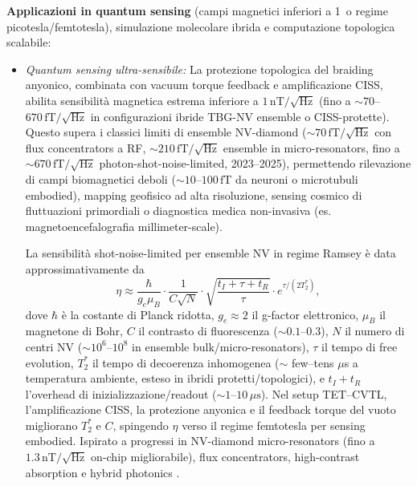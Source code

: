 \documentclass[11pt,a4paper]{article}
\let\oldcite\cite
\renewcommand{\cite}{\protect\oldcite}
\theoremstyle{plain}
\theoremstyle{definition}
\begin{document}
\item \textbf{Applicazioni in quantum sensing} (campi magnetici inferiori a 1\, o regime picotesla/femtotesla), simulazione molecolare ibrida e computazione topologica scalabile:
  \begin{itemize}
      \item \textit{Quantum sensing ultra-sensibile:} La protezione topologica del braiding anyonico, combinata con vacuum torque feedback e amplificazione CISS, abilita sensibilità magnetica estrema inferiore a $1\,\mathrm{nT}/\sqrt{\mathrm{Hz}}$ (fino a $\sim 70$--$670\,\mathrm{fT}/\sqrt{\mathrm{Hz}}$ in configurazioni ibride TBG-NV ensemble o CISS-protette). Questo supera i classici limiti di ensemble NV-diamond ($\sim 70\,\mathrm{fT}/\sqrt{\mathrm{Hz}}$ con flux concentrators a RF, $\sim 210\,\mathrm{fT}/\sqrt{\mathrm{Hz}}$ ensemble in micro-resonators, fino a $\sim 670\,\mathrm{fT}/\sqrt{\mathrm{Hz}}$ photon-shot-noise-limited, 2023--2025), permettendo rilevazione di campi biomagnetici deboli ($\sim 10$--$100\,\mathrm{fT}$ da neuroni o microtubuli embodied), mapping geofisico ad alta risoluzione, sensing cosmico di fluttuazioni primordiali o diagnostica medica non-invasiva (es. magnetoencefalografia millimeter-scale).  
      
      La sensibilità shot-noise-limited per ensemble NV in regime Ramsey è data approssimativamente da
      \begin{equation}
      \eta \approx \frac{\hbar}{g_e \mu_B} \cdot \frac{1}{C \sqrt{N}} \cdot \sqrt{\frac{t_I + \tau + t_R}{\tau}} \cdot e^{\tau / (2 T_2^*)},
      \end{equation}
      dove $\hbar$ è la costante di Planck ridotta, $g_e \approx 2$ il g-factor elettronico, $\mu_B$ il magnetone di Bohr, $C$ il contrasto di fluorescenza ($\sim 0.1$--$0.3$), $N$ il numero di centri NV ($\sim 10^6$--$10^8$ in ensemble bulk/micro-resonators), $\tau$ il tempo di free evolution, $T_2^*$ il tempo di decoerenza inhomogenea ($\sim$ few--tens $\mu$s a temperatura ambiente, esteso in ibridi protetti/topologici), e $t_I + t_R$ l'overhead di inizializzazione/readout ($\sim 1$--$10\,\mu\mathrm{s}$). Nel setup TET--CVTL, l'amplificazione CISS, la protezione anyonica e il feedback torque del vuoto migliorano $T_2^*$ e $C$, spingendo $\eta$ verso il regime femtotesla per sensing embodied. Ispirato a progressi in NV-diamond micro-resonators (fino a $1.3\,\mathrm{nT}/\sqrt{\mathrm{Hz}}$ on-chip migliorabile), flux concentrators, high-contrast absorption e hybrid photonics \cite{silani2023nuclear, katsumi2025high, quantumzeitgeist2025diamond, qant2025qm10}.
      

\end{itemize}
\end{document}
